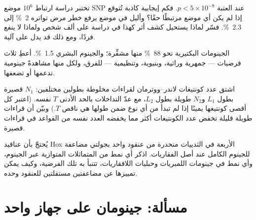 \begin{exercise}[$\star\star$]\label{exo:b3:genomics:9}
تختبر دراسة ارتباط $10^{6}$ موضع SNP عند العتبة $p < 5\times 10^{-8}$.
فكم إيجابية كاذبة تُتوقع إذا لم يكن أي موضع مرتبطًا حقًا؟ وأليل
في موضع يرفع خطر مرض تواتره \qty{2}{\%} إلى
\qty{2.3}{\%}. فسّر لماذا يستحيل كشف أثر كهذا في دراسة على
ألف شخص ولماذا لا ينفع فردًا، ومع ذلك قد يدل
على آلية.
\end{exercise}

\begin{exercise}[$\star\star\star$]\label{exo:b3:genomics:10}
الجينومات البكتيرية نحو \qty{88}{\%} منها مشفِّرة؛ والجينوم البشري
\qty{1.5}{\%}. أعطِ ثلاث فرضيات --- جمهرية وراثية، وبنيوية،
وتنظيمية --- للفرق، ولكل منها مشاهدةً جينومية
تدعمها أو تضعفها.
\end{exercise}

\begin{exercise}[$\star\star\star$]\label{exo:b3:genomics:11}
اشتق عدد كونتيغات لاندر--ووترمان لقراءات مخلوطة بطولين مختلفين:
$N_{1}$  قصيرة بطول $L_{1}$ و$N_{2}$ 
طويلة بطول $L_{2}$، مع عدّ التداخلات بالحد الأدنى $T$ نفسه.
(اعتبر كل  أقصى كونتيغها يمينًا إذا لم تبدأ  من أي
نوع ضمن طولها هي ناقص $T$.) وبيّن أن قراءات طويلة قليلة
تخفض عدد الكونتيغات أكثر مما يخفضه العدد نفسه من القواعد في
قراءات قصيرة.
\end{exercise}

\begin{exercise}[$\star\star\star$]\label{exo:b3:genomics:12}
يُحتجّ بأن عناقيد Hox الأربعة في الثدييات منحدرة من عنقود
واحد بجولتي مضاعفة للجينوم الكامل عند أصل
الفقاريات. اذكر أي نمط من المتماثلات المتوازية عبر الجينوم، وأي
نمط في جينومات اللمبريات وحبليات اللافقاريات، تتنبأ به
تلك الفرضية، وكيف يمكن تمييزها عن
مضاعفتين مستقلتين للعنقود وحده.
\end{exercise}

\section{مسألة: جينومان على جهاز واحد}

